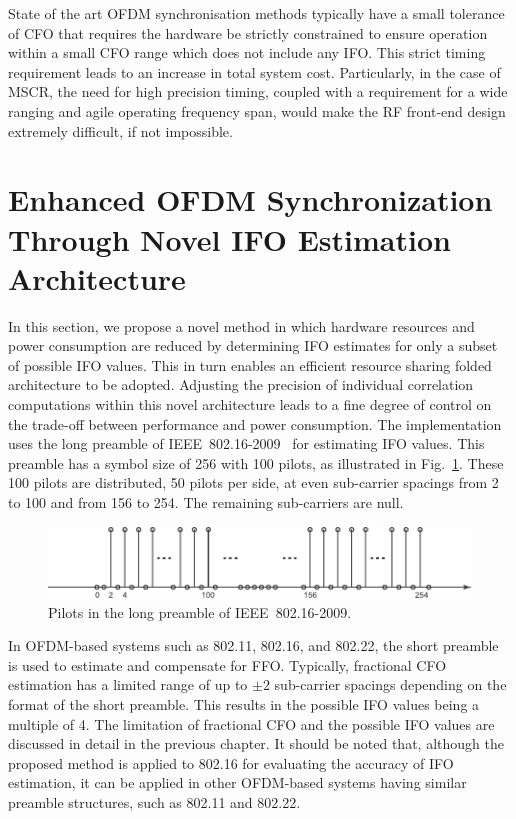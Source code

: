 State of the art OFDM synchronisation methods typically have a small tolerance of CFO that requires the hardware be strictly constrained to ensure operation within a small CFO range which does not include any IFO.
This strict timing requirement leads to an increase in total system cost. Particularly, in the case of MSCR, the need for high precision timing, coupled with a requirement for a wide ranging and agile operating frequency span, would make the RF front-end design extremely difficult, if not impossible.

\section{Enhanced OFDM Synchronization Through Novel IFO Estimation Architecture}
In this section, we propose a novel method in which hardware resources and power consumption are reduced by determining IFO estimates for only a subset of possible IFO values. This in turn enables an efficient resource sharing folded architecture to be adopted. Adjusting the precision of individual correlation computations within this novel architecture leads to a fine degree of control on the trade-off between performance and power consumption.
The implementation uses the long preamble of IEEE~802.16-2009~\cite{IEEE80216} for estimating IFO values.
This preamble has a symbol size of 256 with 100 pilots, as illustrated in Fig.~\ref{fig:long_pre}.
These 100 pilots are distributed, 50 pilots per side, at even sub-carrier spacings from 2 to 100 and from 156 to 254. The remaining sub-carriers are null.
\begin{figure}[b]
    \centerline{\includegraphics [width=1\columnwidth] {figures/long_pre.pdf} }
    \caption{Pilots in the long preamble of IEEE~802.16-2009.}
    \label{fig:long_pre}
\end{figure}
In OFDM-based systems such as 802.11, 802.16, and 802.22, the short preamble is used to estimate and compensate for FFO.
Typically, fractional CFO estimation has a limited range of up to ${\pm}2$ sub-carrier spacings depending on the format of the short preamble.
This results in the possible IFO values being a multiple of 4. The limitation of fractional CFO and the possible IFO values are discussed in detail in the previous chapter.
It should be noted that, although the proposed method is applied to 802.16 for evaluating the accuracy of IFO estimation, it can be applied in other OFDM-based systems having similar preamble structures, such as 802.11 and 802.22.

